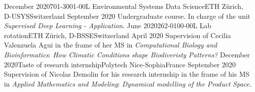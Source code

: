 %
%
%


\begin{experiences}
  \experience
    {December 2020}{701-3001-00L Environmental Systems Data Science}{ETH Zürich, D-USYS}{Switzerland}
    {September 2020}
    {Undergraduate course. In charge of the unit \textit{Supervised Deep Learning - Application}.}{}
    \experience
    {June 2020}{262-0100-00L Lab rotation}{ETH Zürich, D-BSSE}{Switzerland}
    {April 2020}
    {Supervision of Cecilia Valenzuela Agui in the frame of her MS in \textit{Computational Biology and Bioinformatics}: \textit{How Climatic Conditions shape Biodiveristy Patterns?}}{}
    \experience
    {December 2020}{Taste of research internship}{Polytech Nice-Sophia}{France}
    {September 2020}
    {Supervision of Nicolas Demolin for his research internship in the frame of his MS in \textit{Applied Mathematics and Modeling}: \textit{Dynamical modelling of the Product Space.}}{}
\end{experiences}